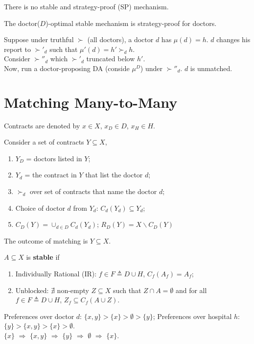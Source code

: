 \documentclass[11pt]{elegantbook}
\begin{document}
\begin{theorem}
    There is no stable and strategy-proof (SP) mechanism.
\end{theorem}


\begin{theorem}
    The doctor($D$)-optimal stable mechanism is strategy-proof for doctors.
\end{theorem}
Suppose under truthful $\succ$ (all doctors), a doctor $d$ has $\mu(d)=h$. $d$ changes his report to $\succ'_d$ such that $\mu'(d)=h'\succ_d h$.\\
Consider $\succ''_d$ which $\succ'_d$ truncated below $h'$.\\
Now, run a doctor-proposing DA (conside $\mu^D$) under $\succ''_d$. $d$ is unmatched.


\section{Matching Many-to-Many}
Contracts are denoted by $x\in X$, $x_D\in D$, $x_H\in H$.

Consider a set of contracts $Y\subseteq X$,
\begin{enumerate}[$\circ$]
    \item $Y_D$ = doctors listed in $Y$;
    \item $Y_d$ = the contract in $Y$ that list the doctor $d$;
    \item $\succ_d$ over set of contracts that name the doctor $d$;
    \item Choice of doctor $d$ from $Y_d$: $C_d(Y_d)\subseteq Y_d$;
    \item $C_D(Y)=\cup_{d\in D}C_d(Y_d)$; $R_D(Y)=X\backslash C_D(Y)$
\end{enumerate}
The outcome of matching is $Y\subseteq X$.

\begin{definition}
    \normalfont
    $A\subseteq X$ is \textbf{stable} if
    \begin{enumerate}[$\circ$]
        \item Individually Rational (IR): $f\in F\triangleq D\cup H$, $C_f(A_f)=A_f$;
        \item Unblocked: $\nexists$ non-empty $Z\subseteq X$ such that $Z\cap A=\emptyset $ and for all $f\in F\triangleq D\cup H$, $Z_f\subseteq C_f(A\cup Z)$.
    \end{enumerate}
\end{definition}

\begin{example}
    Preferences over doctor $d$: $\{x,y\}>\{x\}>\emptyset>\{y\}$; Preferences over hospital $h$: $\{y\}>\{x,y\}>\{x\}>\emptyset$.\\
    $\{x\}$ $\Rightarrow$ $\{x,y\}$ $\Rightarrow$ $\{y\}$ $\Rightarrow$ $\emptyset$ $\Rightarrow$ $\{x\}$.
\end{example}
\end{document}
